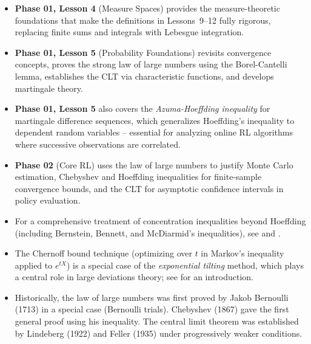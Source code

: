 \documentclass[11pt,a4paper]{article}
\begin{document}
\begin{itemize}
    \item \textbf{Phase 01, Lesson 4} (Measure Spaces) provides the
    measure-theoretic foundations that make the definitions in
    Lessons~9--12 fully rigorous, replacing finite sums and integrals
    with Lebesgue integration.
    \item \textbf{Phase 01, Lesson 5} (Probability Foundations)
    revisits convergence concepts, proves the strong law of large
    numbers using the Borel-Cantelli lemma, establishes the CLT via
    characteristic functions, and develops martingale theory.
    \item \textbf{Phase 01, Lesson 5} also covers the
    \emph{Azuma-Hoeffding inequality} for martingale difference
    sequences, which generalizes Hoeffding's inequality to dependent
    random variables -- essential for analyzing online RL algorithms
    where successive observations are correlated.
    \item \textbf{Phase 02} (Core RL) uses the law of large numbers
    to justify Monte Carlo estimation, Chebyshev and Hoeffding
    inequalities for finite-sample convergence bounds, and the CLT
    for asymptotic confidence intervals in policy evaluation.
    \item For a comprehensive treatment of concentration inequalities
    beyond Hoeffding (including Bernstein, Bennett, and
    McDiarmid's inequalities), see
    \citet[Chapter 2]{durrett2019} and \citet[Appendix A]{grimmett2020}.
    \item The Chernoff bound technique (optimizing over $t$ in
    Markov's inequality applied to $e^{tX}$) is a special case of
    the \emph{exponential tilting} method, which plays a central
    role in large deviations theory; see \citet[Chapter 8]{feller1968}
    for an introduction.
    \item Historically, the law of large numbers was first proved by
    Jakob Bernoulli (1713) in a special case (Bernoulli trials).
    Chebyshev (1867) gave the first general proof using
    his inequality. The central limit theorem was established by
    Lindeberg (1922) and Feller (1935) under progressively weaker
    conditions.
\end{itemize}


\end{document}
